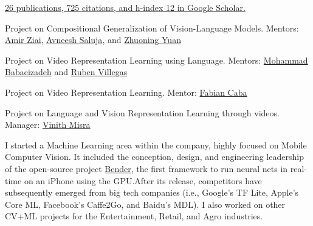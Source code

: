 \documentclass[10pt,a4paper,academicons]{altacv}
\begin{document}
\href{https://scholar.google.com/citations?user=i2LNBfUAAAAJ}{26 publications, 725 citations, and h-index 12 in Google Scholar.}

\vspace{3mm}

\nocite{probing-clip,phenaki,fitclip,wildqa,fiber,whyact,haha-dataset,lifeqa,mustard,humor-detection}

{
\hypersetup{hidelinks}
\printbibliography[heading=none]
}



{\small
Project on Compositional Generalization of Vision-Language Models. Mentors: \href{https://www.linkedin.com/in/amirziai}{Amir Ziai}, \href{https://asaluja.github.io/}{Avneesh Saluja}, and \href{https://zhuoning.cc/}{Zhuoning Yuan}
}

\divider{}


{\small
Project on Video Representation Learning using Language. Mentors: \href{https://web.engr.illinois.edu/~mb2}{Mohammad Babaeizadeh} and \href{https://rubenvillegas.me/}{Ruben Villegas}
}

\divider{}


{\small
Project on Video Representation Learning. Mentor: \href{https://fabiancaba.com/}{Fabian Caba}
}

\divider{}


{\small
Project on Language and Vision Representation Learning through videos. Manager: \href{https://vinmisra.github.io/}{Vinith Misra}
}

\divider{}


{\small
I started a Machine Learning area within the company, highly focused on Mobile Computer Vision. It included the conception, design, and engineering leadership of the open-source project {\href{https://github.com/xmartlabs/Bender}{Bender}}, the first framework to run neural nets in real-time on an iPhone using the GPU.\@ After its release, competitors have subsequently emerged from big tech companies (i.e., Google’s TF Lite, Apple’s Core ML, Facebook’s Caffe2Go, and Baidu’s MDL). I also worked on other CV+ML projects for the Entertainment, Retail, and Agro industries.
}
\end{document}
